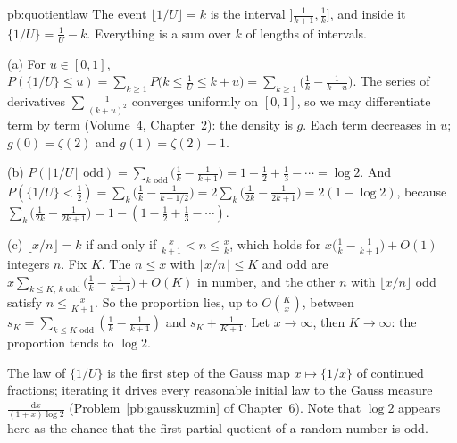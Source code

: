 \begin{solution}{pb:quotientlaw}
\idea The event $\lfloor1/U\rfloor=k$ is the interval $]\frac1{k+1},\frac1k]$, and inside it $\{1/U\}=\frac1U-k$. Everything is a sum over $k$ of
lengths of intervals.

\writeup (a) For $u\in[0,1]$, $P(\{1/U\}\le u)=\sum_{k\ge1}P\bigl(k\le\frac1U\le k+u\bigr)=\sum_{k\ge1}\bigl(\frac1k-\frac1{k+u}\bigr)$. The series of derivatives
$\sum\frac1{(k+u)^2}$ converges uniformly on $[0,1]$, so we may differentiate term by term (Volume~4, Chapter~2): the density is $g$. Each term
decreases in $u$; $g(0)=\zeta(2)$ and $g(1)=\zeta(2)-1$.

(b) $P(\lfloor1/U\rfloor\text{ odd})=\sum_{k\text{ odd}}\bigl(\frac1k-\frac1{k+1}\bigr)=1-\frac12+\frac13-\cdots=\log2$. And
$P(\{1/U\}<\frac12)=\sum_k\bigl(\frac1k-\frac1{k+1/2}\bigr)=2\sum_k\bigl(\frac1{2k}-\frac1{2k+1}\bigr)=2(1-\log2)$, because $\sum_k\bigl(\frac1{2k}-\frac1{2k+1}\bigr)=1-(1-\frac12+\frac13-\cdots)$.

(c) $\lfloor x/n\rfloor=k$ if and only if $\frac x{k+1}<n\le\frac xk$, which holds for $x\bigl(\frac1k-\frac1{k+1}\bigr)+O(1)$ integers $n$. Fix $K$. The $n\le x$
with $\lfloor x/n\rfloor\le K$ and odd are $x\sum_{k\le K,\,k\text{ odd}}\bigl(\frac1k-\frac1{k+1}\bigr)+O(K)$ in number, and the other $n$ with $\lfloor x/n\rfloor$ odd
satisfy $n\le\frac x{K+1}$. So the proportion lies, up to $O(\frac Kx)$, between $s_K=\sum_{k\le K\text{ odd}}(\frac1k-\frac1{k+1})$ and $s_K+\frac1{K+1}$. Let
$x\to\infty$, then $K\to\infty$: the proportion tends to $\log2$.

\leads The law of $\{1/U\}$ is the first step of the Gauss map $x\mapsto\{1/x\}$ of continued fractions; iterating it drives every reasonable
initial law to the Gauss measure $\frac{\mathrm dx}{(1+x)\log2}$ (Problem~\ref{pb:gausskuzmin} of Chapter~6). Note that $\log2$ appears here as the chance that
the first partial quotient of a random number is odd.
\end{solution}

